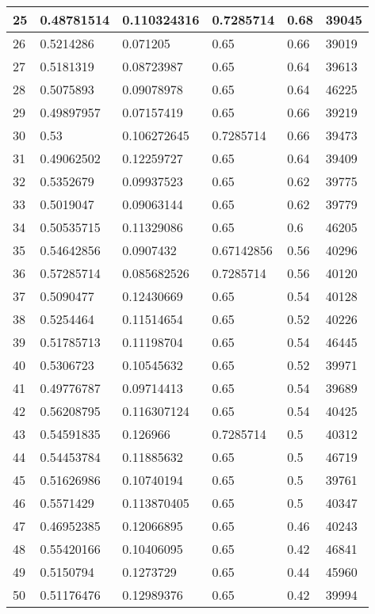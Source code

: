 \begin{longtable}{|l|l|l|l|l|l|}
25 & 0.48781514 & 0.110324316 & 0.7285714 & 0.68 & 39045 \\ \hline 
26 & 0.5214286 & 0.071205 & 0.65 & 0.66 & 39019 \\ \hline 
27 & 0.5181319 & 0.08723987 & 0.65 & 0.64 & 39613 \\ \hline 
28 & 0.5075893 & 0.09078978 & 0.65 & 0.64 & 46225 \\ \hline 
29 & 0.49897957 & 0.07157419 & 0.65 & 0.66 & 39219 \\ \hline 
30 & 0.53 & 0.106272645 & 0.7285714 & 0.66 & 39473 \\ \hline 
31 & 0.49062502 & 0.12259727 & 0.65 & 0.64 & 39409 \\ \hline 
32 & 0.5352679 & 0.09937523 & 0.65 & 0.62 & 39775 \\ \hline 
33 & 0.5019047 & 0.09063144 & 0.65 & 0.62 & 39779 \\ \hline 
34 & 0.50535715 & 0.11329086 & 0.65 & 0.6 & 46205 \\ \hline 
35 & 0.54642856 & 0.0907432 & 0.67142856 & 0.56 & 40296 \\ \hline 
36 & 0.57285714 & 0.085682526 & 0.7285714 & 0.56 & 40120 \\ \hline 
37 & 0.5090477 & 0.12430669 & 0.65 & 0.54 & 40128 \\ \hline 
38 & 0.5254464 & 0.11514654 & 0.65 & 0.52 & 40226 \\ \hline 
39 & 0.51785713 & 0.11198704 & 0.65 & 0.54 & 46445 \\ \hline 
40 & 0.5306723 & 0.10545632 & 0.65 & 0.52 & 39971 \\ \hline 
41 & 0.49776787 & 0.09714413 & 0.65 & 0.54 & 39689 \\ \hline 
42 & 0.56208795 & 0.116307124 & 0.65 & 0.54 & 40425 \\ \hline 
43 & 0.54591835 & 0.126966 & 0.7285714 & 0.5 & 40312 \\ \hline 
44 & 0.54453784 & 0.11885632 & 0.65 & 0.5 & 46719 \\ \hline 
45 & 0.51626986 & 0.10740194 & 0.65 & 0.5 & 39761 \\ \hline 
46 & 0.5571429 & 0.113870405 & 0.65 & 0.5 & 40347 \\ \hline 
47 & 0.46952385 & 0.12066895 & 0.65 & 0.46 & 40243 \\ \hline 
48 & 0.55420166 & 0.10406095 & 0.65 & 0.42 & 46841 \\ \hline 
49 & 0.5150794 & 0.1273729 & 0.65 & 0.44 & 45960 \\ \hline 
50 & 0.51176476 & 0.12989376 & 0.65 & 0.42 & 39994 \\ \hline 
\end{longtable}